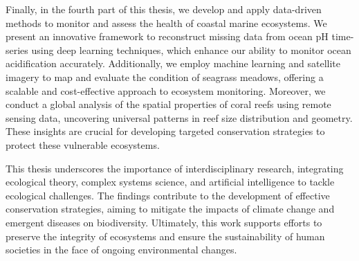 Finally, in the fourth part of this thesis, we develop and apply
data-driven methods to monitor and assess the health of coastal marine
ecosystems. We present an innovative framework to reconstruct missing data
from ocean pH time-series using deep learning techniques, which enhance our
ability to monitor ocean acidification accurately. Additionally, we employ
machine learning and satellite imagery to map and evaluate the condition of
seagrass meadows, offering a scalable and cost-effective approach to
ecosystem monitoring. Moreover, we conduct a global analysis of the spatial
properties of coral reefs using remote sensing data, uncovering universal
patterns in reef size distribution and geometry. These insights are crucial
for developing targeted conservation strategies to protect these vulnerable
ecosystems.

This thesis underscores the importance of interdisciplinary research,
integrating ecological theory, complex systems science, and artificial
intelligence to tackle ecological challenges. The findings contribute to
the development of effective conservation strategies, aiming to mitigate
the impacts of climate change and emergent diseases on biodiversity.
Ultimately, this work supports efforts to preserve the integrity of
ecosystems and ensure the sustainability of human societies in the face of
ongoing environmental changes.

\vfill